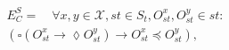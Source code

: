\documentclass[journal,compsoc]{IEEEtran}
\begin{document}
\begin{align}\label{eqn:Causal}
\begin{split}
 E^S_C =   \quad \forall x,y \in \mathcal{X}, \mathit{st} \in \mathit{S_t}, O_\mathit{st}^x, O_\mathit{st}^{y} \in \mathit{st}: \\ \left( \square \left( O_\mathit{st}^x \rightarrow \lozenge O_\mathit{st}^{y} \right)
 \rightarrow O_\mathit{st}^x \preccurlyeq O_\mathit{st}^{y} \right),

\end{split}
\end{align}
\end{document}
